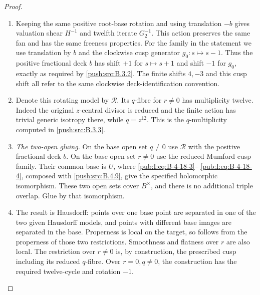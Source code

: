 \begin{proof}
\begin{enumerate}[label=\arabic*.,leftmargin=*]
\item Keeping the same positive root-base rotation and using translation
$-b$ gives valuation shear $H^{-1}$ and twelfth iterate
$G_2^{-1}$. This action preserves the same fan and has the same
freeness properties. For the family in the statement we use
translation by $b$ and the clockwise cusp generator
$g_0:s\mapsto s-1$. Thus the
positive fractional deck $b$ has shift $+1$ for
$s\mapsto s+1$ and shift $-1$ for $g_0$, exactly
as required by \ref{push:src:B.3.2}. The finite shifts $4,-3$
and this cusp shift all refer to the same clockwise
deck-identification convention.

\item Denote this rotating model by $\mathcal R$.
Its $q$-fibre for $r\ne0$ has multiplicity twelve.
Indeed the original $z$-central divisor is reduced
and the finite action has trivial generic isotropy
there, while $q=z^{12}$. This is the $q$-multiplicity computed in \ref{push:src:B.3.3}.

\item \emph{The two-open gluing.}
On the base open set $q\ne0$ use $\mathcal R$ with
the positive fractional deck $b$. On the base open set $r\ne0$
use the reduced Mumford cusp family.
Their common base is $U$, where \eqref{pub:I:eq:B-4-18-3}--
\eqref{pub:I:eq:B-4-18-4}, composed with \ref{push:src:B.4.9}, give the specified
holomorphic isomorphism. These two open sets cover
$B^\times$, and there is no additional triple
overlap. Glue by that isomorphism.

\item The result is Hausdorff: points over one base
point are separated in one of the two given
Hausdorff models, and points with different
base images are separated in the base.
Properness is local on the target, so follows
from the properness of those two restrictions.
Smoothness and flatness over $r$ are also local.
The restriction over $r\ne0$ is, by construction,
the prescribed cusp including its reduced
$q$-fibre. Over $r=0,q\ne0$, the construction has
the required twelve-cycle and rotation $-1$.

\end{enumerate}
\end{proof}